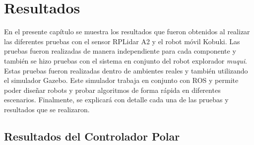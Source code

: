 \chapter{Resultados}
En el presente capítulo se muestra los resultados que fueron obtenidos al realizar
las diferentes pruebas con el sensor RPLidar A2 y el robot móvil Kobuki. Las pruebas
fueron realizadas de manera independiente para cada componente y también se hizo pruebas 
con el sistema en conjunto del robot explorador \textit{muqui}. Estas pruebas fueron 
realizadas dentro de ambientes reales y también utilizando el simulador Gazebo. Este simulador trabaja en conjunto con ROS y permite poder diseñar robots y 
probar algoritmos de forma rápida en diferentes escenarios. Finalmente, se explicará
con detalle cada una de las pruebas y resultados que se realizaron.


\section {Resultados del Controlador Polar}

